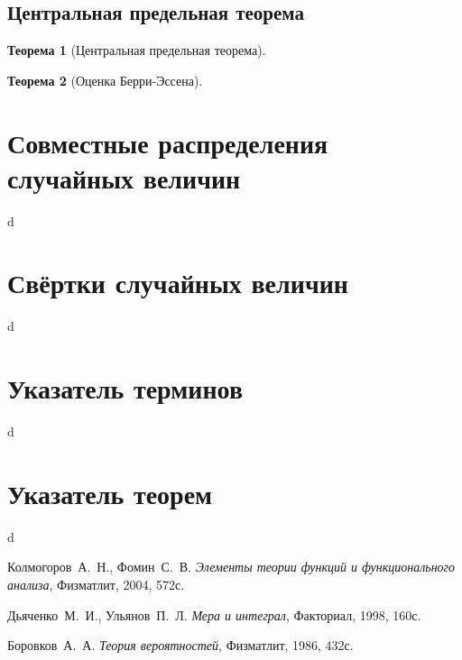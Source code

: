\documentclass[12pt]{article}
\newtheorem{theorem}{Теорема}
\numberwithin{theorem}{section}
\theoremstyle{definition}
\begin{document}
	\subsection{Центральная предельная теорема}
	
	\begin{theorem}[Центральная предельная теорема]
		
	\end{theorem}
	
	\begin{theorem}[Оценка Берри-Эссена]
		
	\end{theorem}
	
	\section{Совместные распределения случайных величин}
	
	d
	
	\section{Свёртки случайных величин}
	
	d
	
	\section{Указатель терминов}
	
	d
	
	\section{Указатель теорем}
	
	d
	
	\begin{thebibliography}{2}
		
		 Колмогоров~А.~Н., Фомин~С.~В. {\it Элементы теории функций и функционального анализа}, Физматлит, 2004, 572с.
		
		 Дьяченко~М.~И., Ульянов~П.~Л. {\it Мера и интеграл}, Факториал, 1998, 160с.
	
		 Боровков~А.~А. {\it Теория вероятностей}, Физматлит, 1986, 432с.
	
	\end{thebibliography}
	
	
\end{document}

